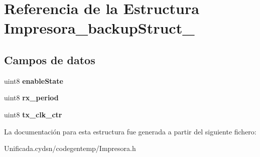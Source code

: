 \hypertarget{struct_impresora__backup_struct__}{}\section{Referencia de la Estructura Impresora\+\_\+backup\+Struct\+\_\+}
\label{struct_impresora__backup_struct__}
\subsection*{Campos de datos}
\begin{DoxyCompactItemize}
\item 
\mbox{\label{struct_impresora__backup_struct___a0d9eac82e0d9647810c46a0da6e36302}} 
uint8 {\bfseries enable\+State}
\item 
\mbox{\label{struct_impresora__backup_struct___ae3d4a93a1533c2c9d210fe52c0d0d387}} 
uint8 {\bfseries rx\+\_\+period}
\item 
\mbox{\label{struct_impresora__backup_struct___a122d7b41973eb1a1e80482af3f40a9fe}} 
uint8 {\bfseries tx\+\_\+clk\+\_\+ctr}
\end{DoxyCompactItemize}


La documentación para esta estructura fue generada a partir del siguiente fichero\+:\begin{DoxyCompactItemize}
\item 
Unificada.\+cydsn/codegentemp/Impresora.\+h\end{DoxyCompactItemize}
